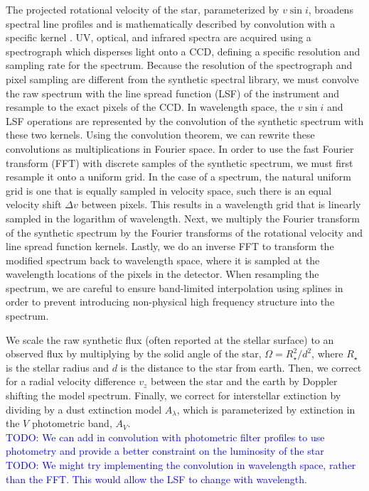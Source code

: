 \documentclass[preprint]{aastex} %
\newcommand{\todo}[1]{ \textcolor{Blue}{\\TODO: #1}}
\begin{document}
The projected rotational velocity of the star, parameterized by $v \sin i$,
broadens spectral line profiles and is mathematically described by convolution
with a specific kernel \citep[Equation 18.14]{gra08}. UV, optical, and infrared
spectra are acquired using a spectrograph which disperses light onto a CCD,
defining a specific resolution and sampling rate for the spectrum.  Because the
resolution of the spectrograph and pixel sampling are different from the
synthetic spectral library, we must convolve the raw spectrum with the line
spread function (LSF) of the instrument and resample to the exact pixels of the
CCD. In wavelength space, the $v \sin i$ and LSF operations are represented by
the convolution of the synthetic spectrum with these two kernels.  Using the
convolution theorem, we can rewrite these convolutions as multiplications in
Fourier space.  In order to use the fast Fourier transform (FFT) with discrete
samples of the synthetic spectrum, we must first resample it
onto a uniform grid.  In the case of a spectrum, the natural
uniform grid is one that is equally sampled in velocity space, such there is an
equal velocity shift $\Delta v$ between pixels. This results in a wavelength
grid that is linearly sampled in the logarithm of wavelength.  Next, we
multiply the Fourier transform of the synthetic spectrum by the Fourier
transforms of the rotational velocity and line spread function kernels.
Lastly, we do an inverse FFT to transform the modified spectrum back to
wavelength space, where it is sampled at the wavelength locations of the pixels
in the detector.  When resampling the spectrum, we are careful to ensure
band-limited interpolation using splines in order to prevent introducing
non-physical high frequency structure into the spectrum.  

We scale the raw synthetic flux (often reported at the stellar surface) to an
observed flux by multiplying by the solid angle of the star, $\Omega =
R_\star^2/d^2$, where $R_\star$ is the stellar radius and $d$ is the distance
to the star from earth. Then, we correct for a radial velocity difference $v_z$ between the
star and the earth by Doppler shifting the model spectrum.  Finally, we correct
for interstellar extinction by dividing by a dust extinction model
$A_\lambda$, which is parameterized by extinction in the $V$ photometric band,
$A_V$. 
\todo{We can add in convolution with photometric filter
profiles to use photometry and provide a better constraint on the luminosity of
the star}
\todo{We might try implementing the convolution in wavelength space, rather
 than the FFT. 
This would allow the LSF to change with wavelength.\\} 
\end{document}
